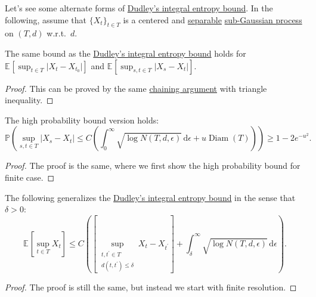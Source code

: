 Let's see some alternate forms of \hyperref[col:Dudley-integral-entropy-bound]{Dudley's integral entropy bound}. In the following, assume that \(\{ X_t \} _{t\in T}\) is a centered and \hyperref[def:separable]{separable} \hyperref[def:sub-Gaussian-process]{sub-Gaussian process} on \((T, d)\) w.r.t.\ \(d\).

\begin{corollary}\label{col:Dudley-integral-entropy-bound-difference}
	The same bound as the \hyperref[col:Dudley-integral-entropy-bound]{Dudley's integral entropy bound} holds for \(\mathbb{E}_{}\left[\sup _{t\in T} \vert X_t - X_{t_0} \vert \right]\) and \(\mathbb{E}_{}\left[\sup _{s, t\in T} \vert X_s - X_t \vert \right]\).
\end{corollary}
\begin{proof}
	This can be proved by the same \hyperref[note:chaining]{chaining argument} with triangle inequality.
\end{proof}

\begin{corollary}\label{col:Dudley-integral-entropy-bound-hp}
	The high probability bound version holds:
	\[
		\mathbb{P} \left(
		\sup _{s, t\in T} \vert X_s - X_t \vert
		\leq C \left( \int_{0}^{\infty} \sqrt{\log N(T, d, \epsilon )}  \,\mathrm{d}\epsilon + u \mathop{\mathrm{Diam}}(T) \right)
		\right) \geq 1 - 2 e^{-u^2}.
	\]
\end{corollary}
\begin{proof}
	The proof is the same, where we first show the high probability bound for finite case.
\end{proof}

\begin{corollary}\label{col:Dudley-integral-entropy-bound-finite-resolution}
	The following generalizes the \hyperref[col:Dudley-integral-entropy-bound]{Dudley's integral entropy bound} in the sense that \(\delta > 0\):
	\[
		\mathbb{E}_{}\left[\sup _{t\in T} X_t \right] \leq C \left( \left[ \sup _{\substack{t, t^{\prime} \in T \\ d(t, t^{\prime} ) \leq \delta }} X_t - X_{t^{\prime} } \right] + \int_{\delta }^{\infty} \sqrt{\log N(T, d, \epsilon )}  \,\mathrm{d}\epsilon \right) .
	\]
\end{corollary}
\begin{proof}
	The proof is still the same, but instead we start with finite resolution.
\end{proof}


